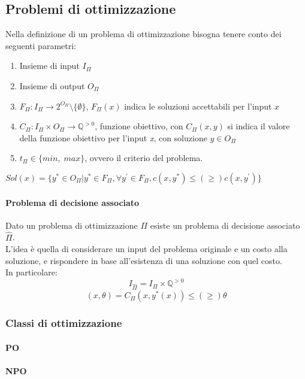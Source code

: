 \subsection{Problemi di ottimizzazione}
Nella definizione di un problema di ottimizzazione bisogna tenere conto dei 
seguenti parametri:
\begin{enumerate}
    \item Insieme di input $I_\Pi$
    \item Insieme di output $O_\Pi$
    \item $F_\Pi : I_\Pi \rightarrow 2^{O_\Pi} \setminus \{\emptyset\}$, $F_\Pi(x)$ indica 
    le soluzioni accettabili per l'input $x$
    \item $C_\Pi : I_\Pi \times O_\Pi \rightarrow \mathbb{Q}^{>0}$, funzione obiettivo, 
    con $C_\Pi(x,y)$ si indica il valore della funzione obiettivo per l'input \emph{x}, con soluzione $y \in O_\Pi$
    \item $t_\Pi \in \{min, \;max\}$, ovvero il criterio del problema.
\end{enumerate}
\begin{remark}
    $Sol(x) = \{y^* \in O_\Pi | y^* \in F_\Pi, \forall y^\prime \in F_\Pi, c(x, y^*) \leqslant (\geq ) c(x, y^\prime)\}$
\end{remark}
\paragraph{Problema di decisione associato}
Dato un problema di ottimizzazione $\Pi$ esiste un problema di decisione associato $\hat{\Pi}$.
\\L'idea è quella di considerare un input del problema originale e un costo alla soluzione, e rispondere
in base all'esistenza di una soluzione con quel costo.\\
In particolare: $$I_{\hat{\Pi}} = I_\Pi \times \mathbb{Q}^{>0}$$ 
$$(x, \theta) = C_\Pi(x, y^*(x)) \leqslant (\geq ) \theta$$

\subsubsection{Classi di ottimizzazione}
\paragraph{PO}

\paragraph{NPO}

